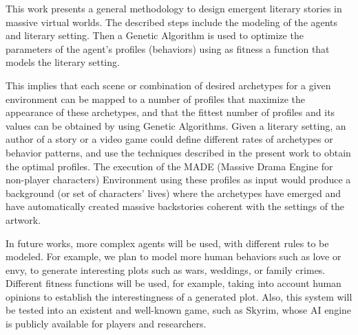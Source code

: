 \documentclass[letterpaper]{article}
\begin{document}
This work presents a general methodology to design emergent literary stories in massive virtual worlds. The described steps include the modeling of the agents and literary setting. Then a Genetic Algorithm is used to optimize the parameters of the agent's profiles (behaviors) using
as fitness a function that models the literary setting. %

This implies that each scene or combination of desired archetypes for a given
environment can be mapped to a number of profiles that maximize the appearance
of these archetypes, and that the fittest number of profiles and its values can
be obtained by using Genetic Algorithms.  
Given a literary setting, an author of a story or a video game could define 
different rates of archetypes or behavior patterns, and use the techniques described in
the present work to obtain the optimal profiles. The execution of the MADE (Massive Drama Engine for non-player characters) Environment
using these profiles as input would produce a background (or set of characters' lives)
where the archetypes have emerged and have automatically created massive backstories coherent
with the settings of the artwork.

In future works, more complex agents will be used, with different rules to be modeled. For example, we plan to model more human behaviors such as love or envy, to generate interesting plots such as wars, weddings, or family crimes. Different fitness functions will be used, for example, taking into account human opinions to establish the interestingness of a generated plot. Also, this system will be tested into an existent and well-known game, such as Skyrim\texttrademark, whose AI engine is publicly available for players and researchers.




%



\end{document}
